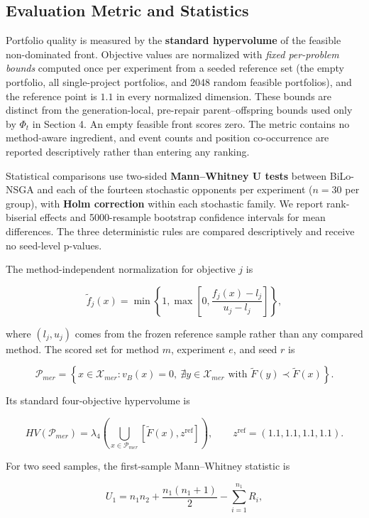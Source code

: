 \documentclass[applsci,article,submit,moreauthors]{Definitions/mdpi}
\begin{document}
\subsection{Evaluation Metric and Statistics}\label{evaluation-metric-and-statistics}

Portfolio quality is measured by the \textbf{standard hypervolume} of the feasible non-dominated front. Objective values are normalized with \emph{fixed per-problem bounds} computed once per experiment from a seeded reference set (the empty portfolio, all single-project portfolios, and 2048 random feasible portfolios), and the reference point is \(1.1\) in every normalized dimension. These bounds are distinct from the generation-local, pre-repair parent--offspring bounds used only by \(\Phi_t\) in Section 4. An empty feasible front scores zero. The metric contains no method-aware ingredient, and event counts and position co-occurrence are reported descriptively rather than entering any ranking.

Statistical comparisons use two-sided \textbf{Mann--Whitney U tests} between BiLo-NSGA and each of the fourteen stochastic opponents per experiment (\(n=30\) per group), with \textbf{Holm correction} within each stochastic family. We report rank-biserial effects and 5000-resample bootstrap confidence intervals for mean differences. The three deterministic rules are compared descriptively and receive no seed-level p-values.

The method-independent normalization for objective \(j\) is

\[
\tilde f_j(x)=\min\!\left\{1,\max\!\left[0,\frac{f_j(x)-l_j}{u_j-l_j}\right]\right\},
\]

where \((l_j,u_j)\) comes from the frozen reference sample rather than any compared method. The scored set for method \(m\), experiment \(e\), and seed \(r\) is

\[
\mathcal{P}_{mer}=\left\{x\in\mathcal{X}_{mer}:v_B(x)=0,\ \nexists y\in\mathcal{X}_{mer}\text{ with }\tilde F(y)\prec\tilde F(x)\right\}.
\]

Its standard four-objective hypervolume is

\[
HV(\mathcal{P}_{mer})=\lambda_4\!\left(\bigcup_{x\in\mathcal{P}_{mer}}[\tilde F(x),z^{\mathrm{ref}}]\right),\qquad z^{\mathrm{ref}}=(1.1,1.1,1.1,1.1).
\]

For two seed samples, the first-sample Mann--Whitney statistic is

\[
U_1=n_1n_2+\frac{n_1(n_1+1)}{2}-\sum_{i=1}^{n_1}R_i,
\]
\end{document}
